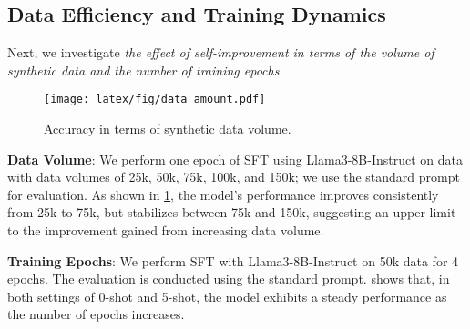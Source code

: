 \begin{table}[t]
\centering

\caption{0-shot robustness w.r.t.\ rephrased prompts (\%).}
\label{tab:random_prompts}
\end{table}

\subsection{Data Efficiency and Training Dynamics}
Next, we investigate \emph{the effect of self-improvement in terms of the volume of synthetic data and the number of training epochs}.

\begin{figure}[t]
  \centering
  \texttt{[image: latex/fig/data\_amount.pdf]}
  \caption{Accuracy in terms of synthetic data volume.}
  \label{fig:data_volume}
\end{figure}

\textbf{Data Volume}: We perform one epoch of SFT using Llama3-8B-Instruct on {\langname} data with data volumes of 25k, 50k, 75k, 100k, and 150k; we use the standard prompt for evaluation. As shown in \cref{fig:data_volume}, the model's performance improves consistently from 25k to 75k, but stabilizes between 75k and 150k, suggesting an upper limit to the improvement gained from increasing data volume.

\textbf{Training Epochs}: We perform SFT with Llama3-8B-Instruct on 50k {\langname} data for 4 epochs. The evaluation is conducted using the standard prompt.  shows that, in both settings of 0-shot and 5-shot, the model exhibits a steady performance as the number of epochs increases. 

